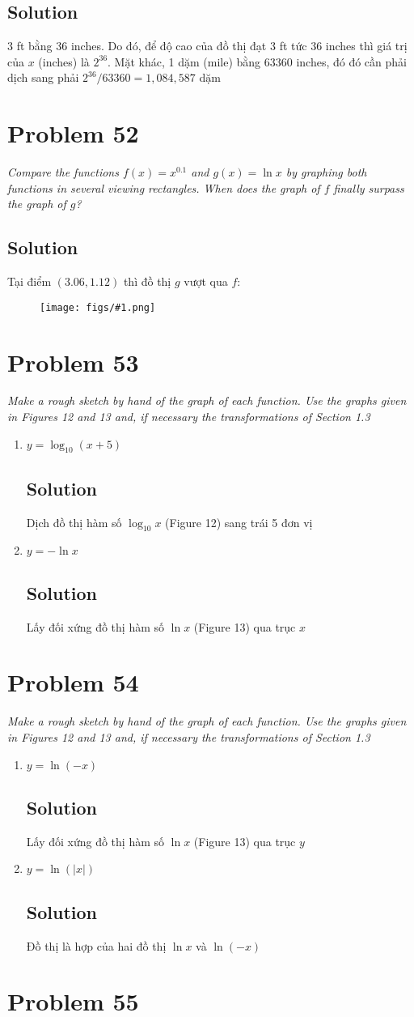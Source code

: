 \documentclass[11pt]{article}
\newcommand{\soln}{\subsection*}
\newcommand{\qn}{\textit}
\newcommand{\imgsoln}[1]{
	\begin{figure}[H]
		\centering
		\texttt{[image: figs/\#1.png]}
	\end{figure}
}
\begin{document}
\soln{Solution}
3 ft bằng 36 inches. Do đó, để độ cao của đồ thị đạt 3 ft tức 36 inches thì giá trị của $x$ (inches) là $2^{36}$. Mặt khác, 1 dặm (mile) bằng 63360 inches, đó đó cần phải dịch sang phải $2^{36}/63360=1,084,587$ dặm

\section*{Problem 52}

\qn{Compare the functions $f(x)=x^{0.1}$ and $g(x)=\ln{x}$ by graphing both functions in several viewing rectangles. When does the graph of $f$ finally surpass the graph of $g$?}

\soln{Solution}
Tại điểm $(3.06, 1.12)$ thì đồ thị $g$ vượt qua $f$:
\imgsoln{1.5.52-ans}

\section*{Problem 53}

\qn{Make a rough sketch by hand of the graph of each function. Use the graphs given in Figures 12 and 13 and, if necessary the transformations of Section 1.3}
\begin{enumerate}
	\item \qn{$y=\log_{10}(x+5)$}
	\soln{Solution}
	Dịch đồ thị hàm số $\log_{10}x$ (Figure 12) sang trái 5 đơn vị
	
	\item \qn{$y=-\ln{x}$}
	\soln{Solution}
	Lấy đối xứng đồ thị hàm số $\ln{x}$ (Figure 13) qua trục $x$
\end{enumerate}

\section*{Problem 54}

\qn{Make a rough sketch by hand of the graph of each function. Use the graphs given in Figures 12 and 13 and, if necessary the transformations of Section 1.3}
\begin{enumerate}
	\item \qn{$y=\ln(-x)$}
	\soln{Solution}
	Lấy đối xứng đồ thị hàm số $\ln{x}$ (Figure 13) qua trục $y$
	
	\item \qn{$y=\ln(|x|)$}
	\soln{Solution}
	Đồ thị là hợp của hai đồ thị $\ln{x}$ và $\ln(-x)$
\end{enumerate}

\section*{Problem 55}
\end{document}
